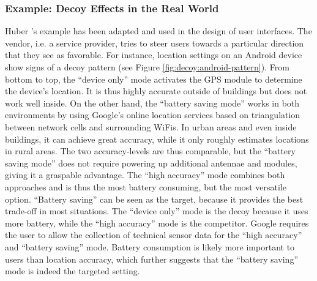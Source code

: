 \subsubsection{Example: Decoy Effects in the Real World}
Huber \etal's example has been adapted and used in the design of user interfaces. The vendor, i.e. a service provider, tries to steer users towards a particular direction that they see as favorable. For instance, location settings on an Android device show signs of a decoy pattern (see Figure \ref{fig:decoy:android-pattern}). From bottom to top, the ``device only'' mode activates the GPS module to determine the device's location. It is thus highly accurate outside of buildings but does not work well inside. On the other hand, the ``battery saving mode'' works in both environments by using Google's online location services based on triangulation between network cells and surrounding WiFis. In urban areas and even inside buildings, it can achieve great accuracy, while it only roughly estimates locations in rural areas. The two accuracy-levels are thus comparable, but the ``battery saving mode'' does not require powering up additional antennae and modules, giving it a graspable advantage. The ``high accuracy'' mode combines both approaches and is thus the most battery consuming, but the most versatile option. ``Battery saving'' can be seen as the target, because it provides the best trade-off in most situations. The ``device only'' mode is the decoy because it uses more battery, while the ``high accuracy'' mode is the competitor. Google requires the user to allow the collection of technical sensor data for the ``high accuracy'' and ``battery saving'' mode. Battery consumption is likely more important to users than location accuracy, which further suggests that the ``battery saving'' mode is indeed the targeted setting. 

